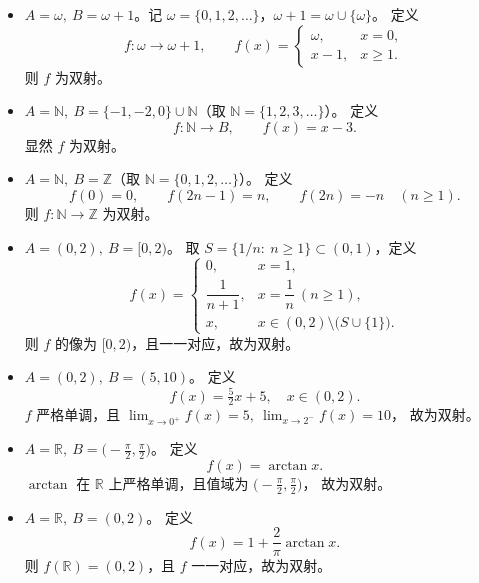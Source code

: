 \begin{solution}
\begin{itemize}
  \item[(1)] $A=\omega,\ B=\omega+1$。记 $\omega=\{0,1,2,\dots\}$，$\omega+1=\omega\cup\{\omega\}$。
  定义
  \[
  f:\omega\to\omega+1,\qquad
  f(x)=
  \begin{cases}
  \omega, & x=0,\\
  x-1, & x\ge 1.
  \end{cases}
  \]
  则 $f$ 为双射。

  \item[(2)] $A=\mathbb N,\ B=\{-1,-2,0\}\cup\mathbb N$（取 $\mathbb N=\{1,2,3,\dots\}$）。
  定义
  \[
  f:\mathbb N\to B,\qquad f(x)=x-3.
  \]
  显然 $f$ 为双射。

  \item[(3)] $A=\mathbb N,\ B=\mathbb Z$（取 $\mathbb N=\{0,1,2,\dots\}$）。
  定义
  \[
  f(0)=0,\qquad f(2n-1)=n,\qquad f(2n)=-n\quad(n\ge1).
  \]
  则 $f:\mathbb N\to\mathbb Z$ 为双射。

  \item[(4)] $A=(0,2),\ B=[0,2)$。
  取 $S=\{1/n:\ n\ge1\}\subset(0,1)$，定义
  \[
  f(x)=
  \begin{cases}
  0, & x=1,\\[4pt]
  \dfrac{1}{n+1}, & x=\dfrac{1}{n}\ (n\ge1),\\[6pt]
  x, & x\in(0,2)\setminus\bigl(S\cup\{1\}\bigr).
  \end{cases}
  \]
  则 $f$ 的像为 $[0,2)$，且一一对应，故为双射。

  \item[(5)] $A=(0,2),\ B=(5,10)$。
  定义
  \[
  f(x)=\tfrac{5}{2}x+5,\quad x\in(0,2).
  \]
  $f$ 严格单调，且
  \(
  \lim_{x\to0^+}f(x)=5,\ 
  \lim_{x\to2^-}f(x)=10
  \)，
  故为双射。

  \item[(6)] $A=\mathbb R,\ B=\bigl(-\tfrac{\pi}{2},\tfrac{\pi}{2}\bigr)$。
  定义
  \[
  f(x)=\arctan x.
  \]
  $\arctan$ 在 $\mathbb R$ 上严格单调，且值域为
  $\bigl(-\tfrac{\pi}{2},\tfrac{\pi}{2}\bigr)$，
  故为双射。

  \item[(7)] $A=\mathbb R,\ B=(0,2)$。
  定义
  \[
  f(x)=1+\frac{2}{\pi}\arctan x.
  \]
  则 $f(\mathbb R)=(0,2)$，且 $f$ 一一对应，故为双射。
\end{itemize}
\end{solution}


